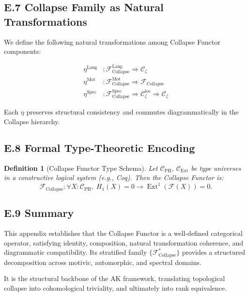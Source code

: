 \documentclass[11pt]{article}
\newtheorem{definition}[theorem]{Definition}
\DeclareMathOperator{\Ext}{Ext}
\begin{document}
\subsection*{E.7 Collapse Family as Natural Transformations}

We define the following natural transformations among Collapse Functor components:

\begin{align*}
\eta^{\mathrm{Lang}} &: \mathcal{F}_{\mathrm{Collapse}}^{\mathrm{Lang}} \Rightarrow \mathcal{C}_\zeta \\
\eta^{\mathrm{Mot}} &: \mathcal{F}_{\mathrm{Collapse}}^{\mathrm{Mot}} \Rightarrow \mathcal{F}_{\mathrm{Collapse}} \\
\eta^{\mathrm{Spec}} &: \mathcal{F}_{\mathrm{Collapse}}^{\mathrm{Spec}} \Rightarrow \mathcal{C}_{\zeta}^{\mathrm{loc}} \Rightarrow \mathcal{C}_\zeta
\end{align*}

Each $\eta$ preserves structural consistency and commutes diagrammatically in the Collapse hierarchy.

\subsection*{E.8 Formal Type-Theoretic Encoding}

\begin{definition}[Collapse Functor Type Schema]
Let $\mathcal{C}_{\mathrm{PH}}$, $\mathcal{C}_{\mathrm{Ext}}$ be type universes in a constructive logical system (e.g., Coq).  
Then the Collapse Functor is:
\[
\mathcal{F}_{\mathrm{Collapse}} : \forall X : \mathcal{C}_{\mathrm{PH}},\; H_1(X) = 0 \to \Ext^1(\mathcal{F}(X)) = 0.
\]
\end{definition}

\subsection*{E.9 Summary}

This appendix establishes that the Collapse Functor is a well-defined categorical operator, satisfying identity, composition, natural transformation coherence, and diagrammatic compatibility.  
Its stratified family $\{\mathcal{F}^{*}_{\mathrm{Collapse}}\}$ provides a structured decomposition across motivic, automorphic, and spectral domains.

It is the structural backbone of the AK framework, translating topological collapse into cohomological triviality, and ultimately into rank equivalence.
\end{document}
